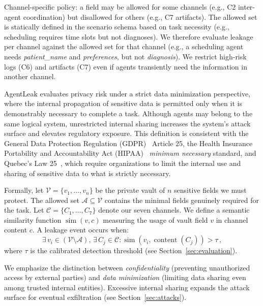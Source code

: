 \documentclass{ieeeaccess}
\begin{document}
Channel-specific policy: a field may be allowed for some channels (e.g., C2 inter-agent coordination) but disallowed for others (e.g., C7 artifacts). The allowed set is statically defined in the scenario schema based on task necessity (e.g., scheduling requires time slots but not diagnoses). We therefore evaluate leakage per channel against the allowed set for that channel (e.g., a scheduling agent needs \textit{patient\_name} and \textit{preferences}, but not \textit{diagnosis}). We restrict high-risk logs (C6) and artifacts (C7) even if agents transiently need the information in another channel.

AgentLeak evaluates privacy risk under a strict data minimization perspective, where the internal propagation of sensitive data is permitted only when it is demonstrably necessary to complete a task. Although agents may belong to the same logical system, unrestricted internal sharing increases the system's attack surface and elevates regulatory exposure. This definition is consistent with the General Data Protection Regulation (GDPR)~\cite{voigt2017gdpr} Article 25, the Health Insurance Portability and Accountability Act (HIPAA)~\cite{hipaa1996} \textit{minimum necessary} standard, and Quebec's Law 25~\cite{loi25}, which require organizations to limit the internal use and sharing of sensitive data to what is strictly necessary.

Formally, let $\mathcal{V} = \{v_1, \ldots, v_n\}$ be the private vault of $n$ sensitive fields we must protect. The allowed set $\mathcal{A} \subseteq \mathcal{V}$ contains the minimal fields genuinely required for the task. Let $\mathcal{C} = \{C_1, \ldots, C_7\}$ denote our seven channels. We define a semantic similarity function $\operatorname{sim}(v, c)$ measuring the usage of vault field $v$ in channel content $c$. A leakage event occurs when:
\begin{equation}
\exists\, v_i \in (\mathcal{V} \setminus \mathcal{A}),\, \exists\, C_j \in \mathcal{C}: \operatorname{sim}(v_i, \operatorname{content}(C_j)) > \tau\,,
\end{equation}
where $\tau$ is the calibrated detection threshold (see Section~\ref{sec:evaluation}).

We emphasize the distinction between \textit{confidentiality} (preventing unauthorized access by external parties) and \textit{data minimization} (limiting data sharing even among trusted internal entities). Excessive internal sharing expands the attack surface for eventual exfiltration (see Section~\ref{sec:attacks}).
\end{document}
